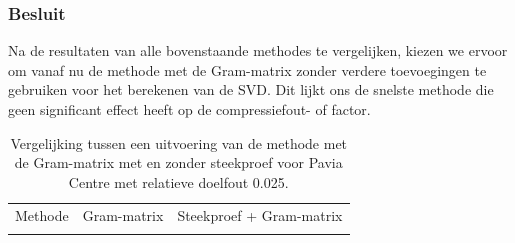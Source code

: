 \subsubsection{Besluit}

Na de resultaten van alle bovenstaande methodes te vergelijken, kiezen we ervoor om vanaf nu de methode met de Gram-matrix zonder verdere toevoegingen te gebruiken voor het berekenen van de SVD. Dit lijkt ons de snelste methode die geen significant effect heeft op de compressiefout- of factor.

\newpage
\begin{table}[H]
\centering
\begin{tabular}{|l|l|l|}
\hline
Methode & Gram-matrix & Steekproef + Gram-matrix\\ \hhline{|=|=|=|}

\end{tabular}
\caption{Vergelijking tussen een uitvoering van de methode met de Gram-matrix met en zonder steekproef voor Pavia Centre met relatieve doelfout 0.025.}
\label{table:randomized-svd-pavia-test}
\end{table}